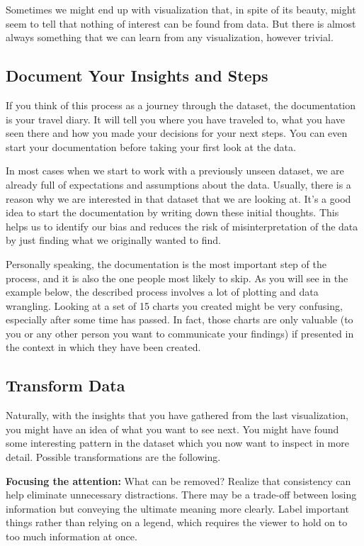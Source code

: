 \documentclass[]{book}
\theoremstyle{definition}
\theoremstyle{definition}
\theoremstyle{definition}
\theoremstyle{remark}
\begin{document}
Sometimes we might end up with visualization that, in spite of its
beauty, might seem to tell that nothing of interest can be found from
data. But there is almost always something that we can learn from any
visualization, however trivial.

\subsection{Document Your Insights and
Steps}\label{document-your-insights-and-steps}

If you think of this process as a journey through the dataset, the
documentation is your travel diary. It will tell you where you have
traveled to, what you have seen there and how you made your decisions
for your next steps. You can even start your documentation before taking
your first look at the data.

In most cases when we start to work with a previously unseen dataset, we
are already full of expectations and assumptions about the data.
Usually, there is a reason why we are interested in that dataset that we
are looking at. It's a good idea to start the documentation by writing
down these initial thoughts. This helps us to identify our bias and
reduces the risk of misinterpretation of the data by just finding what
we originally wanted to find.

Personally speaking, the documentation is the most important step of the
process, and it is also the one people most likely to skip. As you will
see in the example below, the described process involves a lot of
plotting and data wrangling. Looking at a set of 15 charts you created
might be very confusing, especially after some time has passed. In fact,
those charts are only valuable (to you or any other person you want to
communicate your findings) if presented in the context in which they
have been created.

\subsection{Transform Data}\label{transform-data}

Naturally, with the insights that you have gathered from the last
visualization, you might have an idea of what you want to see next. You
might have found some interesting pattern in the dataset which you now
want to inspect in more detail. Possible transformations are the
following.

\textbf{Focusing the attention:} What can be removed? Realize that
consistency can help eliminate unnecessary distractions. There may be a
trade-off between losing information but conveying the ultimate meaning
more clearly. Label important things rather than relying on a legend,
which requires the viewer to hold on to too much information at once.
\end{document}
